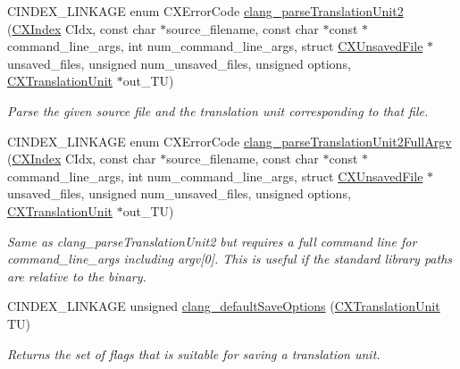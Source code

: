 \begin{DoxyCompactItemize}
C\+I\+N\+D\+E\+X\+\_\+\+L\+I\+N\+K\+A\+GE enum C\+X\+Error\+Code \mbox{\hyperlink{group__CINDEX__TRANSLATION__UNIT_ga494de0e725c5ae40cbdea5fa6081027d}{clang\+\_\+parse\+Translation\+Unit2}} (\mbox{\hyperlink{group__CINDEX_gae039c2574bfd75774ca7a9a3e55910cb}{C\+X\+Index}} C\+Idx, const char $\ast$source\+\_\+filename, const char $\ast$const $\ast$command\+\_\+line\+\_\+args, int num\+\_\+command\+\_\+line\+\_\+args, struct \mbox{\hyperlink{structCXUnsavedFile}{C\+X\+Unsaved\+File}} $\ast$unsaved\+\_\+files, unsigned num\+\_\+unsaved\+\_\+files, unsigned options, \mbox{\hyperlink{group__CINDEX_gacdb7815736ca709ce9a5e1ec2b7e16ac}{C\+X\+Translation\+Unit}} $\ast$out\+\_\+\+TU)
\begin{DoxyCompactList}\small\item\em Parse the given source file and the translation unit corresponding to that file. \end{DoxyCompactList}\item 
\mbox{\label{group__CINDEX__TRANSLATION__UNIT_ga1270c19516b75bac85797ebb837c64e1}} 
C\+I\+N\+D\+E\+X\+\_\+\+L\+I\+N\+K\+A\+GE enum C\+X\+Error\+Code \mbox{\hyperlink{group__CINDEX__TRANSLATION__UNIT_ga1270c19516b75bac85797ebb837c64e1}{clang\+\_\+parse\+Translation\+Unit2\+Full\+Argv}} (\mbox{\hyperlink{group__CINDEX_gae039c2574bfd75774ca7a9a3e55910cb}{C\+X\+Index}} C\+Idx, const char $\ast$source\+\_\+filename, const char $\ast$const $\ast$command\+\_\+line\+\_\+args, int num\+\_\+command\+\_\+line\+\_\+args, struct \mbox{\hyperlink{structCXUnsavedFile}{C\+X\+Unsaved\+File}} $\ast$unsaved\+\_\+files, unsigned num\+\_\+unsaved\+\_\+files, unsigned options, \mbox{\hyperlink{group__CINDEX_gacdb7815736ca709ce9a5e1ec2b7e16ac}{C\+X\+Translation\+Unit}} $\ast$out\+\_\+\+TU)
\begin{DoxyCompactList}\small\item\em Same as clang\+\_\+parse\+Translation\+Unit2 but requires a full command line for {\ttfamily command\+\_\+line\+\_\+args} including argv\mbox{[}0\mbox{]}. This is useful if the standard library paths are relative to the binary. \end{DoxyCompactList}\item 
C\+I\+N\+D\+E\+X\+\_\+\+L\+I\+N\+K\+A\+GE unsigned \mbox{\hyperlink{group__CINDEX__TRANSLATION__UNIT_ga4cb02bd2ceed0380a761391ba7a69092}{clang\+\_\+default\+Save\+Options}} (\mbox{\hyperlink{group__CINDEX_gacdb7815736ca709ce9a5e1ec2b7e16ac}{C\+X\+Translation\+Unit}} TU)
\begin{DoxyCompactList}\small\item\em Returns the set of flags that is suitable for saving a translation unit. \end{DoxyCompactList}\item 

\end{DoxyCompactItemize}
